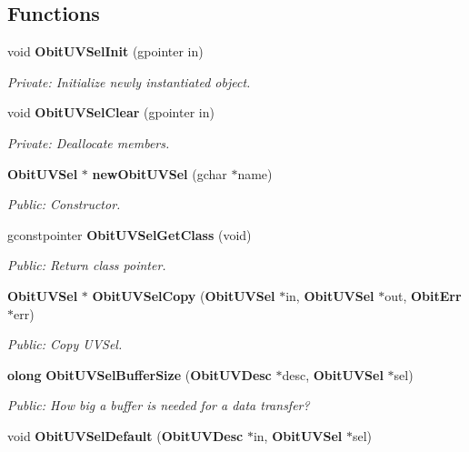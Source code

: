 \subsection*{Functions}
\begin{CompactItemize}
\item 
void {\bf Obit\-UVSel\-Init} (gpointer in)
\begin{CompactList}\small\item\em Private: Initialize newly instantiated object. \item\end{CompactList}\item 
void {\bf Obit\-UVSel\-Clear} (gpointer in)
\begin{CompactList}\small\item\em Private: Deallocate members. \item\end{CompactList}\item 
{\bf Obit\-UVSel} $\ast$ {\bf new\-Obit\-UVSel} (gchar $\ast$name)
\begin{CompactList}\small\item\em Public: Constructor. \item\end{CompactList}\item 
gconstpointer {\bf Obit\-UVSel\-Get\-Class} (void)
\begin{CompactList}\small\item\em Public: Return class pointer. \item\end{CompactList}\item 
{\bf Obit\-UVSel} $\ast$ {\bf Obit\-UVSel\-Copy} ({\bf Obit\-UVSel} $\ast$in, {\bf Obit\-UVSel} $\ast$out, {\bf Obit\-Err} $\ast$err)
\begin{CompactList}\small\item\em Public: Copy UVSel. \item\end{CompactList}\item 
{\bf olong} {\bf Obit\-UVSel\-Buffer\-Size} ({\bf Obit\-UVDesc} $\ast$desc, {\bf Obit\-UVSel} $\ast$sel)
\begin{CompactList}\small\item\em Public: How big a buffer is needed for a data transfer? \item\end{CompactList}\item 
void {\bf Obit\-UVSel\-Default} ({\bf Obit\-UVDesc} $\ast$in, {\bf Obit\-UVSel} $\ast$sel)

\end{CompactItemize}
